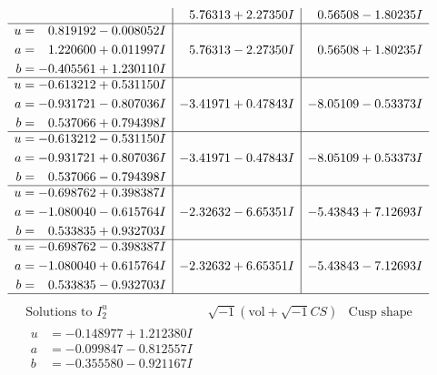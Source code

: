 \documentclass[1p]{elsarticle_modified}
\theoremstyle{definition}
\newcommand{\I}{\sqrt{-1}}
\begin{document}
$$\begin{array}{c|c|c}
 & \phantom{-}5.76313 + 2.27350 I & \phantom{-}0.56508 - 1.80235 I \\ \hline\begin{aligned}
u &= \phantom{-}0.819192 - 0.008052 I \\
a &= \phantom{-}1.220600 + 0.011997 I \\
b &= -0.405561 + 1.230110 I\end{aligned}
 & \phantom{-}5.76313 - 2.27350 I & \phantom{-}0.56508 + 1.80235 I \\ \hline\begin{aligned}
u &= -0.613212 + 0.531150 I \\
a &= -0.931721 - 0.807036 I \\
b &= \phantom{-}0.537066 + 0.794398 I\end{aligned}
 & -3.41971 + 0.47843 I & -8.05109 - 0.53373 I \\ \hline\begin{aligned}
u &= -0.613212 - 0.531150 I \\
a &= -0.931721 + 0.807036 I \\
b &= \phantom{-}0.537066 - 0.794398 I\end{aligned}
 & -3.41971 - 0.47843 I & -8.05109 + 0.53373 I \\ \hline\begin{aligned}
u &= -0.698762 + 0.398387 I \\
a &= -1.080040 - 0.615764 I \\
b &= \phantom{-}0.533835 + 0.932703 I\end{aligned}
 & -2.32632 - 6.65351 I & -5.43843 + 7.12693 I \\ \hline\begin{aligned}
u &= -0.698762 - 0.398387 I \\
a &= -1.080040 + 0.615764 I \\
b &= \phantom{-}0.533835 - 0.932703 I\end{aligned}
 & -2.32632 + 6.65351 I & -5.43843 - 7.12693 I\\
 \hline 
 \end{array}$$\newpage$$\begin{array}{c|c|c}  
\text{Solutions to }I^u_{2}& \I (\text{vol} + \sqrt{-1}CS) & \text{Cusp shape}\\
 \hline 
\begin{aligned}
u &= -0.148977 + 1.212380 I \\
a &= -0.099847 - 0.812557 I \\
b &= -0.355580 - 0.921167 I\end{aligned}

\end{array}$$
\end{document}
